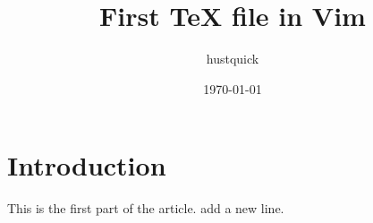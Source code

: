 \documentclass[11pt, twocolumn]{article}
\begin{document}
\title{First TeX file in Vim}
\author{hustquick}
\date{\today}
\maketitle
	\section{Introduction}
	This is the first part of the article.
	add a new line.
\end{document}
